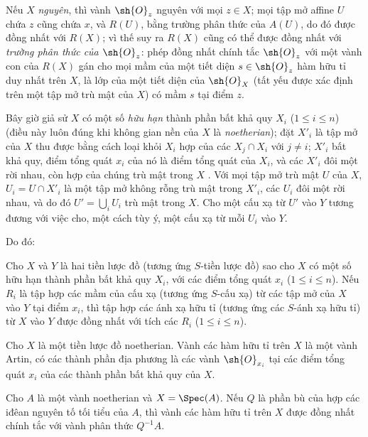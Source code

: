 \documentclass[oneside]{amsart}
\renewcommand{\leq}{\leqslant}
\newcommand{\oldpage}[2][]{{\marginnote{\normalfont\textbf{#1}~|~#2}}\ignorespaces}
\let\EGAOriginalLabel\label
\renewcommand{\label}[1]{\phantomsection\EGAOriginalLabel{#1}}
\begin{document}
Nếu $X$ \emph{nguyên}, thì vành $\sh{O}_z$ nguyên với mọi $z\in X$; mọi tập mở affine $U$ chứa $z$ cũng chứa $x$, và $R(U)$, bằng trường phân thức của $A(U)$, do đó được đồng nhất với $R(X)$; vì thế suy ra $R(X)$ cũng có thể được đồng nhất với \emph{trường phân thức của $\sh{O}_z$}: phép đồng nhất chính tắc $\sh{O}_z$ với một vành con của $R(X)$ gán cho mọi mầm của một tiết diện $s\in\sh{O}_z$ hàm hữu tỉ duy nhất trên $X$, là lớp của một tiết diện của $\sh{O}_X$ (tất yếu được xác định trên một tập mở trù mật của $X$) có mầm $s$ tại điểm $z$.

\begin{env}[7.1.6]
\label{I.7.1.6}
Bây giờ giả sử $X$ có một số \emph{hữu hạn} thành phần bất khả quy $X_i$ ($1\leq i\leq n$) (điều này luôn đúng khi không gian nền của $X$ là \emph{noetherian}); đặt $X'_i$ là tập mở của $X$ thu được bằng cách loại khỏi $X_i$ hợp của các $X_j\cap X_i$ với $j\neq i$; $X'_i$ bất khả quy, điểm tổng quát $x_i$ của nó là điểm tổng quát của $X_i$, và các $X'_i$ đôi một rời nhau, còn hợp của chúng trù mật trong $X$ .
Với
\oldpage[I]{157}
mọi tập mở trù mật $U$ của $X$, $U_i=U\cap X'_i$ là một tập mở không rỗng trù mật trong $X'_i$, các $U_i$ đôi một rời nhau, và do đó $U'=\bigcup_i U_i$ trù mật trong $X$.
Cho một cấu xạ từ $U'$ vào $Y$ tương đương với việc cho, một cách tùy ý, một cấu xạ từ mỗi $U_i$ vào $Y$.
\end{env}

Do đó:

\begin{proposition}[7.1.7]
\label{I.7.1.7}
Cho $X$ và $Y$ là hai tiền lược đồ (tương ứng $S$-tiền lược đồ) sao cho $X$ có một số hữu hạn thành phần bất khả quy $X_i$, với các điểm tổng quát $x_i$ ($1\leq i\leq n$).
Nếu $R_i$ là tập hợp các mầm của cấu xạ (tương ứng $S$-cấu xạ) từ các tập mở của $X$ vào $Y$ tại điểm $x_i$, thì tập hợp các ánh xạ hữu tỉ (tương ứng các $S$-ánh xạ hữu tỉ) từ $X$ vào $Y$ được đồng nhất với tích các $R_i$ ($1\leq i\leq n$).
\end{proposition}

\begin{corollary}[7.1.8]
\label{I.7.1.8}
Cho $X$ là một tiền lược đồ noetherian.
Vành các hàm hữu tỉ trên $X$ là một vành Artin, có các thành phần địa phương là các vành $\sh{O}_{x_i}$ tại các điểm tổng quát $x_i$ của các thành phần bất khả quy của $X$.
\end{corollary}

\begin{corollary}[7.1.9]
\label{I.7.1.9}
Cho $A$ là một vành noetherian và $X=\Spec(A)$.
Nếu $Q$ là phần bù của hợp các iđêan nguyên tố tối tiểu của $A$, thì vành các hàm hữu tỉ trên $X$ được đồng nhất chính tắc với vành phân thức $Q^{-1}A$.
\end{corollary}
\end{document}

